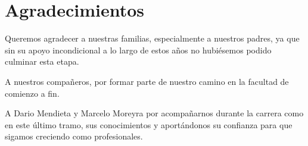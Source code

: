 \chapter*{Agradecimientos}
Queremos agradecer a nuestras familias, especialmente a nuestros padres, ya que sin su apoyo incondicional a lo largo de estos años no hubiésemos podido culminar esta etapa.

A nuestros compañeros, por formar parte de nuestro camino en la facultad de comienzo a fin.

A Dario Mendieta y Marcelo Moreyra por acompañarnos durante la carrera como en este último tramo,
sus conocimientos y aportándonos su confianza para que sigamos creciendo como profesionales.

